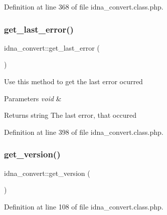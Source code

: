 Definition at line 368 of file idna\+\_\+convert.\+class.\+php.

\hypertarget{classidna__convert_adcf7a0902a83a834ce05fc34a460fccd}{}\label{classidna__convert_adcf7a0902a83a834ce05fc34a460fccd} 
\subsubsection{\texorpdfstring{get\+\_\+last\+\_\+error()}{get\_last\_error()}}
{\footnotesize\ttfamily idna\+\_\+convert\+::get\+\_\+last\+\_\+error (\begin{DoxyParamCaption}{ }\end{DoxyParamCaption})}

Use this method to get the last error ocurred 
\begin{DoxyParams}{Parameters}
{\em void} & \\
\hline
\end{DoxyParams}
\begin{DoxyReturn}{Returns}
string The last error, that occured 
\end{DoxyReturn}


Definition at line 398 of file idna\+\_\+convert.\+class.\+php.

\hypertarget{classidna__convert_a59d30af851a16b87ac00a96931fe7e61}{}\label{classidna__convert_a59d30af851a16b87ac00a96931fe7e61} 
\subsubsection{\texorpdfstring{get\+\_\+version()}{get\_version()}}
{\footnotesize\ttfamily idna\+\_\+convert\+::get\+\_\+version (\begin{DoxyParamCaption}{ }\end{DoxyParamCaption})}



Definition at line 108 of file idna\+\_\+convert.\+class.\+php.

\hypertarget{classidna__convert_aff2ec039994038d13c8000addff58de3}{}\label{classidna__convert_aff2ec039994038d13c8000addff58de3} 

